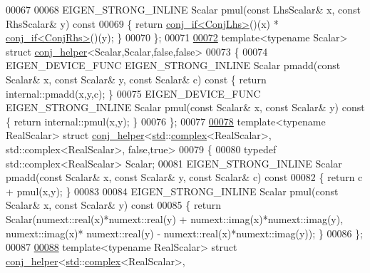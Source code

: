 \begin{DoxyCode}
00067 
00068   EIGEN\_STRONG\_INLINE Scalar pmul(\textcolor{keyword}{const} LhsScalar& x, \textcolor{keyword}{const} RhsScalar& y)\textcolor{keyword}{ const}
00069 \textcolor{keyword}{  }\{ \textcolor{keywordflow}{return} \hyperlink{struct_eigen_1_1internal_1_1conj__if}{conj\_if<ConjLhs>}()(x) *  \hyperlink{struct_eigen_1_1internal_1_1conj__if}{conj\_if<ConjRhs>}()(y); \}
00070 \};
00071 
\hyperlink{struct_eigen_1_1internal_1_1conj__helper_3_01_scalar_00_01_scalar_00_01false_00_01false_01_4}{00072} \textcolor{keyword}{template}<\textcolor{keyword}{typename} Scalar> \textcolor{keyword}{struct }\hyperlink{struct_eigen_1_1internal_1_1conj__helper}{conj\_helper}<Scalar,Scalar,false,false>
00073 \{
00074   EIGEN\_DEVICE\_FUNC EIGEN\_STRONG\_INLINE Scalar pmadd(\textcolor{keyword}{const} Scalar& x, \textcolor{keyword}{const} Scalar& y, \textcolor{keyword}{const} Scalar& c)\textcolor{keyword}{
       const }\{ \textcolor{keywordflow}{return} internal::pmadd(x,y,c); \}
00075   EIGEN\_DEVICE\_FUNC EIGEN\_STRONG\_INLINE Scalar pmul(\textcolor{keyword}{const} Scalar& x, \textcolor{keyword}{const} Scalar& y)\textcolor{keyword}{ const }\{ \textcolor{keywordflow}{return} 
      internal::pmul(x,y); \}
00076 \};
00077 
\hyperlink{struct_eigen_1_1internal_1_1conj__helper_3_01std_1_1complex_3_01_real_scalar_01_4_00_01std_1_1co17cad1c9f1dd5f8fd2568a2fb541b29b}{00078} \textcolor{keyword}{template}<\textcolor{keyword}{typename} RealScalar> \textcolor{keyword}{struct }\hyperlink{struct_eigen_1_1internal_1_1conj__helper}{conj\_helper}<\hyperlink{namespacestd}{std}::\hyperlink{structcomplex}{complex}<RealScalar>, 
      std::complex<RealScalar>, false,true>
00079 \{
00080   \textcolor{keyword}{typedef} std::complex<RealScalar> Scalar;
00081   EIGEN\_STRONG\_INLINE Scalar pmadd(\textcolor{keyword}{const} Scalar& x, \textcolor{keyword}{const} Scalar& y, \textcolor{keyword}{const} Scalar& c)\textcolor{keyword}{ const}
00082 \textcolor{keyword}{  }\{ \textcolor{keywordflow}{return} c + pmul(x,y); \}
00083 
00084   EIGEN\_STRONG\_INLINE Scalar pmul(\textcolor{keyword}{const} Scalar& x, \textcolor{keyword}{const} Scalar& y)\textcolor{keyword}{ const}
00085 \textcolor{keyword}{  }\{ \textcolor{keywordflow}{return} Scalar(numext::real(x)*numext::real(y) + numext::imag(x)*numext::imag(y), numext::imag(x)*
      numext::real(y) - numext::real(x)*numext::imag(y)); \}
00086 \};
00087 
\hyperlink{struct_eigen_1_1internal_1_1conj__helper_3_01std_1_1complex_3_01_real_scalar_01_4_00_01std_1_1coc8c8eb305908066796b4a168e94f9c59}{00088} \textcolor{keyword}{template}<\textcolor{keyword}{typename} RealScalar> \textcolor{keyword}{struct }\hyperlink{struct_eigen_1_1internal_1_1conj__helper}{conj\_helper}<\hyperlink{namespacestd}{std}::\hyperlink{structcomplex}{complex}<RealScalar>, 

\end{DoxyCode}
